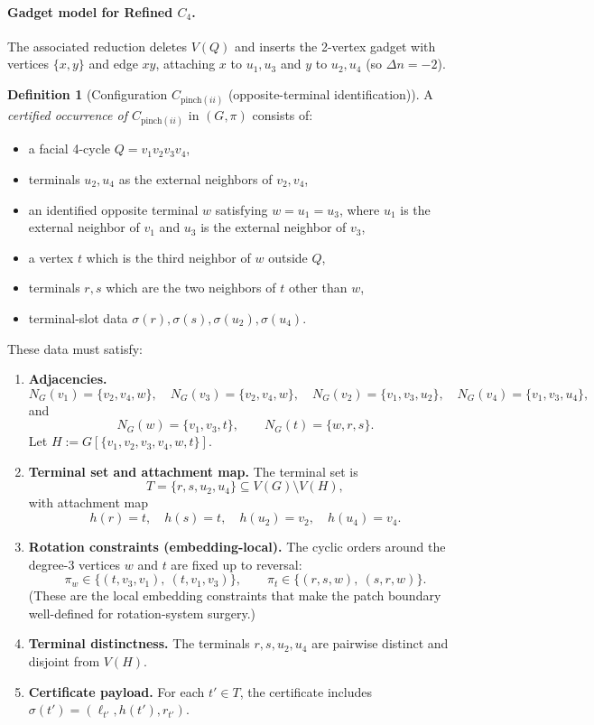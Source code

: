 \documentclass[12pt]{article}
\theoremstyle{definition}
\newtheorem{definition}[theorem]{Definition}
\newcommand{\RefinedCFourGadgetVertices}{2}
\newcommand{\RefinedCfourDelta}{-2}
\begin{document}
\paragraph{Gadget model for Refined $C_4$.}
The associated reduction deletes $V(Q)$ and inserts the \RefinedCFourGadgetVertices-vertex gadget with vertices $\{x,y\}$ and edge $xy$, attaching $x$ to $u_1,u_3$ and $y$ to $u_2,u_4$ (so $\Delta n = \RefinedCfourDelta$).

\medskip

\begin{definition}[Configuration $C_{\mathrm{pinch}(ii)}$ (opposite-terminal identification)]
\label{def:pinchii-occ}
A \emph{certified occurrence of $C_{\mathrm{pinch}(ii)}$} in $(G,\pi)$ consists of:

\begin{itemize}
\item a facial 4-cycle $Q=v_1v_2v_3v_4$,
\item terminals $u_2,u_4$ as the external neighbors of $v_2,v_4$,
\item an identified opposite terminal $w$ satisfying $w=u_1=u_3$, where
$u_1$ is the external neighbor of $v_1$ and $u_3$ is the external neighbor of $v_3$,
\item a vertex $t$ which is the third neighbor of $w$ outside $Q$,
\item terminals $r,s$ which are the two neighbors of $t$ other than $w$,
\item terminal-slot data $\sigma(r),\sigma(s),\sigma(u_2),\sigma(u_4)$.
\end{itemize}

These data must satisfy:

\begin{enumerate}
\item \textbf{Adjacencies.}
\[
N_G(v_1)=\{v_2,v_4,w\},\quad N_G(v_3)=\{v_2,v_4,w\},\quad
N_G(v_2)=\{v_1,v_3,u_2\},\quad N_G(v_4)=\{v_1,v_3,u_4\},
\]
and
\[
N_G(w)=\{v_1,v_3,t\},\qquad N_G(t)=\{w,r,s\}.
\]
Let $H:=G[\{v_1,v_2,v_3,v_4,w,t\}]$.

\item \textbf{Terminal set and attachment map.}
The terminal set is
\[
T=\{r,s,u_2,u_4\}\subseteq V(G)\setminus V(H),
\]
with attachment map
\[
h(r)=t,\quad h(s)=t,\quad h(u_2)=v_2,\quad h(u_4)=v_4.
\]

\item \textbf{Rotation constraints (embedding-local).}
The cyclic orders around the degree-3 vertices $w$ and $t$ are fixed up to reversal:
\[
\pi_w \in \{(t,v_3,v_1),\ (t,v_1,v_3)\},\qquad
\pi_t \in \{(r,s,w),\ (s,r,w)\}.
\]
(These are the local embedding constraints that make the patch boundary well-defined
for rotation-system surgery.)

\item \textbf{Terminal distinctness.}
The terminals $r,s,u_2,u_4$ are pairwise distinct and disjoint from $V(H)$.

\item \textbf{Certificate payload.}
For each $t'\in T$, the certificate includes $\sigma(t')=(\ell_{t'},h(t'),r_{t'})$.
\end{enumerate}
\end{definition}
\end{document}
